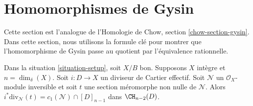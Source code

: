 \section{Homomorphismes de Gysin}
\label{section-gysin}

\noindent
Cette section est l'analogue de l'Homologie de Chow, section
\ref{chow-section-gysin}. Dans cette section, nous utilisons la formule clé
pour montrer que l'homomorphisme de Gysin passe au quotient par l'équivalence rationnelle.

\begin{lemma}
\label{lemma-gysin-factors-general}
Dans la situation \ref{situation-setup}, soit $X/B$ bon. Supposons
$X$ intègre et $n = \dim_\delta(X)$. Soit $i : D \to X$ un
diviseur de Cartier effectif. Soit $\mathcal{N}$ un $\mathcal{O}_X$-module
inversible et soit $t$ une section méromorphe non nulle de $\mathcal{N}$. Alors
$i^*\text{div}_\mathcal{N}(t) = c_1(\mathcal{N}) \cap [D]_{n - 1}$ dans
$\CH_{n - 2}(D)$.
\end{lemma}

